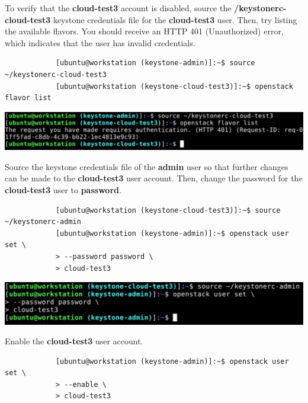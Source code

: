 \documentclass[letterpaper, 12pt]{article}
\begin{document}
\begin{enumerate}
    \begin{labstep}
        To verify that the \textbf{cloud-test3} account is disabled, source the
        \textbf{\texttildemid/keystonerc-cloud-test3} keystone credentials file for the \textbf{cloud-test3} user.
        Then, try listing the available flavors.
        You should receive an HTTP 401 (Unauthorized) error, which indicates that the user has invalid credentials.
        \begin{lstlisting}
            [ubuntu@workstation (keystone-admin)]:~$ source ~/keystonerc-cloud-test3
            [ubuntu@workstation (keystone-cloud-test3)]:~$ openstack flavor list
        \end{lstlisting}

        \begin{center}
            \includegraphics[width=\linewidth]{images/part4/step14.png}
        \end{center}
    \end{labstep}

    \begin{labstep}
        Source the keystone credentials file of the \textbf{admin} user so that further changes can be made to the \textbf{cloud-test3} user account.
        Then, change the password for the \textbf{cloud-test3} user to \textbf{password}.
        \begin{lstlisting}
            [ubuntu@workstation (keystone-cloud-test3)]:~$ source ~/keystonerc-admin
            [ubuntu@workstation (keystone-admin)]:~$ openstack user set \
            > --password password \
            > cloud-test3
        \end{lstlisting}

        \begin{center}
            \includegraphics[width=\linewidth]{images/part4/step15.png}
        \end{center}
    \end{labstep}

    \begin{labstep}
        Enable the \textbf{cloud-test3} user account.
        \begin{lstlisting}
            [ubuntu@workstation (keystone-admin)]:~$ openstack user set \
            > --enable \
            > cloud-test3
        \end{lstlisting}


\end{labstep}
\end{enumerate}
\end{document}
